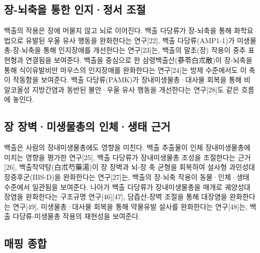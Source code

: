 \documentclass[12pt,oneside]{book}
\begin{document}
\subsection{장-뇌축을 통한 인지·정서 조절}

백출의 작용은 장에 머물지 않고 뇌로 이어진다. 백출 다당류가 장-뇌축을 통해 화학요법으로 유발된 우울 유사 행동을 완화한다는 연구[22], 백출 다당류(AMP1-1)가 미생물총-장-뇌축을 통해 인지장애를 개선한다는 연구[23]는, 백출의 말초(장) 작용이 중추 표현형과 연결됨을 보여준다. 백출을 중심으로 한 삼령백출산(蔘苓白朮散)이 장-뇌축을 통해 식이유발비만 마우스의 인지장애를 완화한다는 연구[24]는 방제 수준에서도 이 축이 작동함을 보여준다. 백출 다당류(PAMK)가 장내미생물총·대사물 회복을 통해 비알코올성 지방간염과 동반된 불안·우울 유사 행동을 개선한다는 연구[28]도 같은 흐름에 놓인다.

\subsection{장 장벽·미생물총의 인체·생태 근거}

백출은 사람의 장내미생물총에도 영향을 미친다. 백출 추출물이 인체 장내미생물총에 미치는 영향을 평가한 연구[25], 백출 다당류가 장내미생물총 조성을 조절한다는 근거[26], 백출작약탕(白朮芍藥湯)이 장 장벽과 뇌-장 축 균형을 회복하여 설사형 과민성대장증후군(IBS-D)을 완화한다는 연구[27]는, 백출의 장-뇌축 작용이 동물·인체·생태 수준에서 일관됨을 보여준다. 나아가 백출 다당류가 장내미생물총을 매개로 궤양성대장염을 완화한다는 구조규명 연구[46][47], 담즙산-장벽 조절을 통해 대장염을 완화한다는 연구[49], 미생물총·대사물 회복을 통해 약물유발 설사를 완화한다는 연구[48]는, 백출 다당류-미생물총 작용의 재현성을 보여준다.

\subsection{매핑 종합}

\vspace{2pt}\vspace{3pt}
\end{document}
